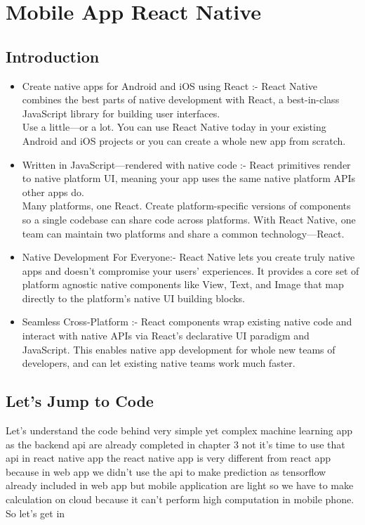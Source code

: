 \section{Mobile App React Native} 

\subsection{Introduction}

\begin{itemize}
  \item Create native apps for Android and iOS using React :- React Native combines the best parts of native development with React, a best-in-class JavaScript library for building user interfaces.\\
  Use a little—or a lot. You can use React Native today in your existing Android and iOS projects or you can create a whole new app from scratch.
  \item Written in JavaScript—rendered with native code :- React primitives render to native platform UI, meaning your app uses the same native platform APIs other apps do.\\
Many platforms, one React. Create platform-specific versions of components so a single codebase can share code across platforms. With React Native, one team can maintain two platforms and share a common technology—React.
  \item Native Development For Everyone:- React Native lets you create truly native apps and doesn't compromise your users' experiences. It provides a core set of platform agnostic native components like View, Text, and Image that map directly to the platform’s native UI building blocks.
  \item Seamless Cross-Platform :- React components wrap existing native code and interact with native APIs via React’s declarative UI paradigm and JavaScript. This enables native app development for whole new teams of developers, and can let existing native teams work much faster.
  
\end{itemize}

\subsection{Let's Jump to Code}
Let's understand the code behind very simple yet complex machine learning app as the backend api are already completed in chapter 3 not it's time to use that api in react native app the react native app is very different from react app because in web app we didn't use the api to make prediction as tensorflow already included in web app but mobile application are light so we have to make calculation on cloud because it can't perform high computation in mobile phone. So let's get in\\

